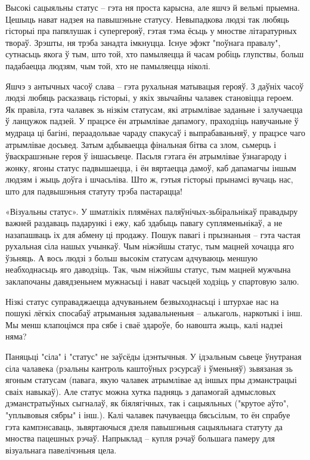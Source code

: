 Высокі сацыяльны статус – гэта ня проста карысна, але яшчэ й вельмі прыемна. Цешыць нават надзея на павышэньне статусу. Невыпадкова людзі так любяць гісторыі пра папялушак і супергерояў, гэтая тэма ёсьць у мностве літаратурных твораў. Зрэшты, ня трэба занадта імкнуцца. Існуе эфэкт "поўнага правалу", сутнасьць якога ў тым, што той, хто памыляецца й часам робіць глупствы, больш падабаецца людзям, чым той, хто не памыляецца ніколі.

Яшчэ з антычных часоў слава – гэта рухальная матывацыя герояў. З даўніх часоў людзі любяць расказваць гісторыі, у якіх звычайны чалавек становіцца героем. Як правіла, гэта чалавек зь нізкім статусам, які атрымлівае заданьне і залучаецца ў ланцужок падзей. У працэсе ён атрымлівае дапамогу, праходзіць навучаньне ў мудраца ці багіні, пераадольвае чараду спакусаў і выпрабаваньняў, у працэсе чаго атрымлівае досьвед. Затым адбываецца фінальная бітва са злом, сьмерць і ўваскрашэньне героя ў іншасьвеце. Пасьля гэтага ён атрымлівае ўзнагароду і жонку, ягоны статус падвышаецца, і ён вяртаецца дамоў, каб дапамагчы іншым людзям і жыць доўга і шчасьліва. Што ж, гэтыя гісторыі прынамсі вучаць нас, што для падвышэньня статуту трэба пастарацца!

«Візуальны статус». У шматлікіх плямёнах паляўнічых-зьбіральнікаў правадыру важней раздаваць падарункі і ежу, каб здабыць павагу супляменьнікаў, а не назапашваць іх для абмену ці продажу. Пошук павагі і прызнаньня – гэта частая рухальная сіла нашых учынкаў. Чым ніжэйшы статус, тым мацней хочацца яго ўзьняць. А вось людзі з больш высокім статусам адчуваюць меншую неабходнасьць яго даводзіць. Так, чым ніжэйшы статус, тым мацней мужчына заклапочаны давядзеньнем мужнасьці і нават часьцей ходзіць у спартовую залю.

Нізкі статус суправаджаецца адчуваньнем безвыходнасьці і штурхае нас на пошукі лёгкіх спосабаў атрыманьня задавальненьня – алькаголь, наркотыкі і інш. Мы менш клапоцімся пра сябе і сваё здароўе, бо навошта жыць, калі надзеі няма?

Паняцьці "сіла" і "статус" не заўсёды ідэнтычныя. У ідэальным сьвеце ўнутраная сіла чалавека (рэальны кантроль каштоўных рэсурсаў і ўменьняў) зьвязаная зь ягоным статусам (павага, якую чалавек атрымлівае ад іншых пры дэманстрацыі сваіх навыкаў). Але статус можна хутка падняць з дапамогай адмысловых дэманстратыўных сыгналаў, як біялягічных, так і сацыяльных ("крутое аўто", "уплывовыя сябры" і інш.). Калі чалавек пачуваецца бясьсілым, то ён спрабуе гэта кампэнсаваць, зьвяртаючыся дзеля павышэньня сацыяльнага статуту да мноства пацешных рэчаў. Напрыклад – купля рэчаў большага памеру для візуальнага павелічэньня цела.

